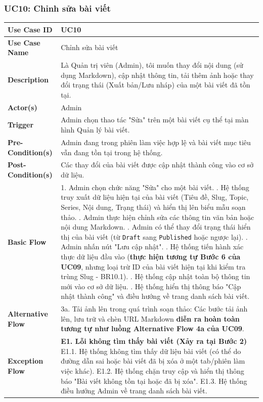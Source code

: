 \documentclass[a4paper,12pt]{article}
\begin{document}
\subsubsection{UC10: Chỉnh sửa bài viết}
\begin{longtable}{|p{4cm}|p{11.5cm}|}
\hline
\textbf{Use Case ID} & UC10 \\ \hline
\textbf{Use Case Name} & Chỉnh sửa bài viết \\ \hline
\textbf{Description} & Là Quản trị viên (Admin), tôi muốn thay đổi nội dung (sử dụng Markdown), cập nhật thông tin, tải thêm ảnh hoặc thay đổi trạng thái (Xuất bản/Lưu nháp) của một bài viết đã tồn tại. \\ \hline
\textbf{Actor(s)} & Admin \\ \hline
\textbf{Trigger} & Admin chọn thao tác "Sửa" trên một bài viết cụ thể tại màn hình Quản lý bài viết. \\ \hline
\textbf{Pre-Condition(s)} & Admin đang trong phiên làm việc hợp lệ và bài viết mục tiêu vẫn đang tồn tại trong hệ thống. \\ \hline
\textbf{Post-Condition(s)} & Các thay đổi của bài viết được cập nhật thành công vào cơ sở dữ liệu. \\ \hline
\textbf{Basic Flow} & 
1. Admin chọn chức năng "Sửa" cho một bài viết. \newline
2. Hệ thống truy xuất dữ liệu hiện tại của bài viết (Tiêu đề, Slug, Topic, Series, Nội dung, Trạng thái) và hiển thị lên biểu mẫu soạn thảo. \newline
3. Admin thực hiện chỉnh sửa các thông tin văn bản hoặc nội dung Markdown. \newline
4. Admin có thể thay đổi trạng thái hiển thị của bài viết (từ \texttt{Draft} sang \texttt{Published} hoặc ngược lại). \newline
5. Admin nhấn nút "Lưu cập nhật". \newline
6. Hệ thống tiến hành xác thực dữ liệu đầu vào (\textbf{thực hiện tương tự Bước 6 của UC09}, nhưng loại trừ ID của bài viết hiện tại khi kiểm tra trùng Slug - BR10.1). \newline
7. Hệ thống cập nhật toàn bộ thông tin mới vào cơ sở dữ liệu. \newline
8. Hệ thống hiển thị thông báo "Cập nhật thành công" và điều hướng về trang danh sách bài viết. \\ \hline
\textbf{Alternative Flow} & 
3a. Tải ảnh lên trong quá trình soạn thảo: \newline
Các bước tải ảnh lên, lưu trữ và chèn URL Markdown \textbf{diễn ra hoàn toàn tương tự như luồng Alternative Flow 4a của UC09}. \\ \hline
\textbf{Exception Flow} & 
\textbf{E1. Lỗi không tìm thấy bài viết (Xảy ra tại Bước 2)} \newline
E1.1. Hệ thống không tìm thấy dữ liệu bài viết (có thể do đường dẫn sai hoặc bài viết đã bị xóa ở một tab/phiên làm việc khác). \newline
E1.2. Hệ thống chặn truy cập và hiển thị thông báo "Bài viết không tồn tại hoặc đã bị xóa". \newline
E1.3. Hệ thống điều hướng Admin về trang danh sách bài viết. \newline


\end{longtable}
\end{document}
